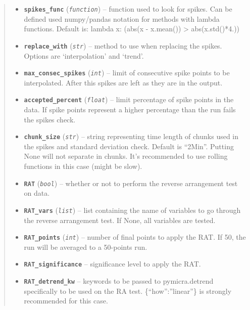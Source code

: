 \documentclass[a4paper,10pt,oneside]{sphinxmanual}
\begin{document}
\begin{fulllineitems}
\begin{quote}
\begin{description}
\begin{itemize}
\item {} 
\textbf{\texttt{spikes\_func}} (\emph{\texttt{function}}) -- function used to look for spikes. Can be defined used numpy/pandas notation for methods with lambda functions.
Default is: lambda x: (abs(x - x.mean()) \textgreater{} abs(x.std()*4.))

\item {} 
\textbf{\texttt{replace\_with}} (\emph{\texttt{str}}) -- method to use when replacing the spikes. Options are `interpolation' and `trend'.

\item {} 
\textbf{\texttt{max\_consec\_spikes}} (\emph{\texttt{int}}) -- limit of consecutive spike points to be interpolated. After this spikes are left as they are in the output.

\item {} 
\textbf{\texttt{accepted\_percent}} (\emph{\texttt{float}}) -- limit percentage of spike points in the data. If spike points represent a higher percentage
than the run fails the spikes check.

\item {} 
\textbf{\texttt{chunk\_size}} (\emph{\texttt{str}}) -- string representing time length of chunks used in the spikes and standard deviation check. Default is ``2Min''.
Putting None will not separate in chunks. It's recommended to use rolling functions in this case (might be slow).

\item {} 
\textbf{\texttt{RAT}} (\emph{\texttt{bool}}) -- whether or not to perform the reverse arrangement test on data.

\item {} 
\textbf{\texttt{RAT\_vars}} (\emph{\texttt{list}}) -- list containing the name of variables to go through the reverse arrangement test. If None, all variables are tested.

\item {} 
\textbf{\texttt{RAT\_points}} (\emph{\texttt{int}}) -- number of final points to apply the RAT. If 50, the run will be averaged to a 50-points run.

\item {} 
\textbf{\texttt{RAT\_significance}} -- significance level to apply the RAT.

\item {} 
\textbf{\texttt{RAT\_detrend\_kw}} -- keywords to be passed to pymicra.detrend specifically to be used on the RA test. \{``how'':''linear''\}
is strongly recommended for this case.


\end{itemize}
\end{description}
\end{quote}
\end{fulllineitems}
\end{document}
